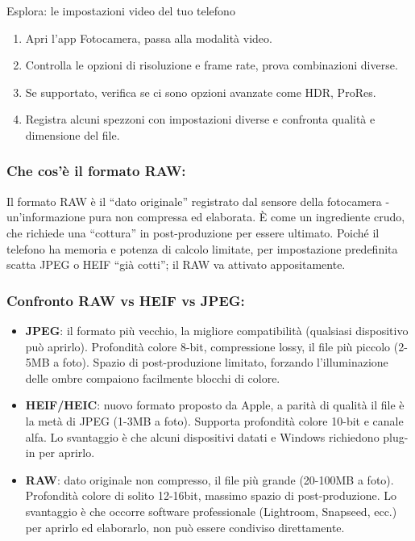\begin{tcbpractice}{Esplora: le impostazioni video del tuo telefono}
\begin{enumerate}
  \item Apri l'app Fotocamera, passa alla modalità video.
  \item Controlla le opzioni di risoluzione e frame rate, prova combinazioni diverse.
  \item Se supportato, verifica se ci sono opzioni avanzate come HDR, ProRes.
  \item Registra alcuni spezzoni con impostazioni diverse e confronta qualità e dimensione del file.
\end{enumerate}

\end{tcbpractice}


\subsubsection*{Che cos'è il formato RAW:}

Il formato RAW è il “dato originale” registrato dal sensore della fotocamera - un'informazione pura non compressa ed elaborata. È come un ingrediente crudo, che richiede una “cottura” in post-produzione per essere ultimato. Poiché il telefono ha memoria e potenza di calcolo limitate, per impostazione predefinita scatta JPEG o HEIF “già cotti”; il RAW va attivato appositamente.

\subsubsection*{Confronto RAW vs HEIF vs JPEG:}

\begin{itemize}
  \item \textbf{JPEG}: il formato più vecchio, la migliore compatibilità (qualsiasi dispositivo può aprirlo). Profondità colore 8-bit, compressione lossy, il file più piccolo (2-5MB a foto). Spazio di post-produzione limitato, forzando l'illuminazione delle ombre compaiono facilmente blocchi di colore.
  \item \textbf{HEIF/HEIC}: nuovo formato proposto da Apple, a parità di qualità il file è la metà di JPEG (1-3MB a foto). Supporta profondità colore 10-bit e canale alfa. Lo svantaggio è che alcuni dispositivi datati e Windows richiedono plug-in per aprirlo.
  \item \textbf{RAW}: dato originale non compresso, il file più grande (20-100MB a foto). Profondità colore di solito 12-16bit, massimo spazio di post-produzione. Lo svantaggio è che occorre software professionale (Lightroom, Snapseed, ecc.) per aprirlo ed elaborarlo, non può essere condiviso direttamente.
\end{itemize}

